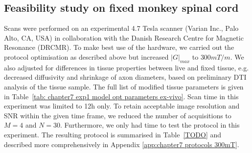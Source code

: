\subsection{Feasibility study on fixed monkey spinal cord}
Scans were performed on an experimental 4.7 Tesla scanner (Varian Inc., Palo Alto, CA, USA) in collaboration with the Danish Research Centre for Magnetic Resonance (DRCMR). To make best use of the hardware, we carried out the protocol optimisation as described above but increased $|G|_{max}$ to $300mT/m$. We also adjusted for differences in tissue properties between live and fixed tissue, e.g. decreased diffusivity and shrinkage of axon diameters, based on preliminary \gls{DTI} analysis of the tissue sample. The full list of modified tissue parameters is given in Table~\ref{tab: chapter7 exp1 model opt parameters ex-vivo}. Scan time in this experiment was limited to 12h only. To retain acceptable image resolution and \gls{SNR} within the given time frame, we reduced the number of acquisitions to $M=4$ and $N=30$. Furthermore, we only had time to test the {\FD} protocol in this experiment. The resulting protocol is summarised in Table~\ref{TODO} and described more comprehensively in Appendix \ref{app:chapter7 protocols 300mT}. 
